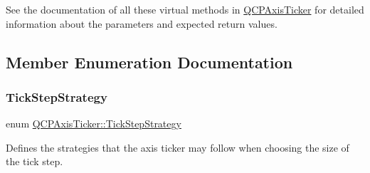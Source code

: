 See the documentation of all these virtual methods in \hyperlink{class_q_c_p_axis_ticker}{Q\+C\+P\+Axis\+Ticker} for detailed information about the parameters and expected return values. 

\subsection{Member Enumeration Documentation}
\mbox{\label{class_q_c_p_axis_ticker_ab6d2f9d9477821623ac9bc4b21ddf49a}} 
\subsubsection{\texorpdfstring{Tick\+Step\+Strategy}{TickStepStrategy}\hspace{0.1cm}{\footnotesize\ttfamily [1/2]}}
{\footnotesize\ttfamily enum \hyperlink{class_q_c_p_axis_ticker_ab6d2f9d9477821623ac9bc4b21ddf49a}{Q\+C\+P\+Axis\+Ticker\+::\+Tick\+Step\+Strategy}}

Defines the strategies that the axis ticker may follow when choosing the size of the tick step.

